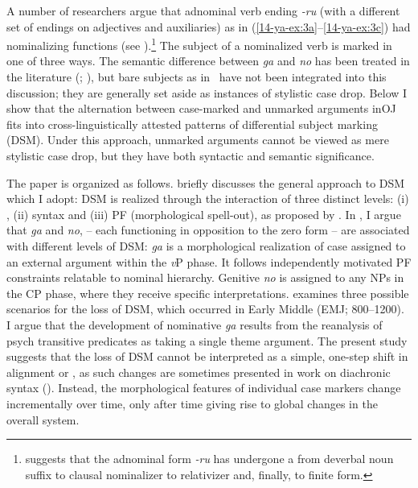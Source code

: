 \documentclass[output=paper]{LSP/langsci}
\begin{document}
A number of researchers argue that adnominal verb ending \textit{-ru} (with a different set of endings on adjectives and auxiliaries) as in (\ref{14-ya-ex:3a}--\ref{14-ya-ex:3c}) had nominalizing functions (see \citealt{Miyagawa1989Structure,Yanagidaetal2009Word,Robbeets2015Diachrony}).\footnote{\citet{Robbeets2015Diachrony} suggests that the adnominal form \textit{-ru} has undergone a  from deverbal noun suffix to clausal nominalizer to relativizer and, finally, to finite form.} The subject of a nominalized verb is marked in one of three ways. The semantic difference between \textit{ga} and \textit{no} has been treated in the literature (\cf \citealt{Ohno1977Development}; \citealt{Nomura1993Particles}), but bare subjects as in~ have not been integrated into this discussion; they are generally set aside as instances of stylistic case drop. Below I show that the alternation between case-marked and unmarked arguments inOJ  fits into cross-linguistically attested patterns of differential subject marking (DSM). Under this approach, unmarked arguments cannot be viewed as mere stylistic case drop, but they have both syntactic and semantic significance. 

The paper is organized as follows.  briefly discusses the general approach to DSM which I adopt: DSM is realized through the interaction of three distinct levels: (i) , (ii) syntax and (iii) PF (morphological spell-out), as proposed by \citet{Woolford2008Differential}. In , I argue that \textit{ga} and \textit{no}, – each functioning in opposition to the zero form – are associated with different levels of DSM: \textit{ga} is a morphological realization of  case assigned to an external argument within the \textit{v}P phase. It follows independently motivated PF constraints relatable to  nominal hierarchy. Genitive \textit{no} is assigned to any NPs in the CP phase, where they receive specific interpretations.  examines three possible scenarios for the loss of DSM, which occurred in Early Middle  (EMJ; 800–1200). I argue that the development of nominative \textit{ga} results from the reanalysis of psych transitive predicates as  taking a single theme argument. The present study suggests that the loss of DSM cannot be interpreted as a simple, one-step shift in alignment or , as such changes are sometimes presented in work on diachronic syntax (\cf \citealt{Harrisetal1995Historical}). Instead, the morphological features of individual case markers change incrementally over time, only after time giving rise to global changes in the overall system.
\end{document}

